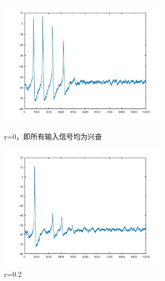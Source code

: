 \documentclass[
    bachelor,
    nofont, %
    pdflinks,
    ]{xjtuthesis}
\begin{document}
\begin{figure}
\begin{minipage}[!ht]{0.5\linewidth}
\centering
\includegraphics[width=3.2in]{p10r0_2.jpg}
\caption{r=0，即所有输入信号均为兴奋}
\end{minipage}%
\begin{minipage}[!ht]{0.5\linewidth}
\centering
\includegraphics[width=3.2in]{p10r0_2_2.jpg}
\caption{r=0.2}
\end{minipage}
\end{figure}
\end{document}
